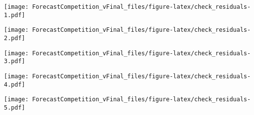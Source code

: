 \documentclass[
]{article}
\newenvironment{Shaded}{\begin{snugshade}}{\end{snugshade}}
\newcommand{\AttributeTok}[1]{\textcolor[rgb]{0.77,0.63,0.00}{#1}}
\newcommand{\FunctionTok}[1]{\textcolor[rgb]{0.00,0.00,0.00}{#1}}
\newcommand{\NormalTok}[1]{#1}
\newcommand{\SpecialCharTok}[1]{\textcolor[rgb]{0.00,0.00,0.00}{#1}}
\newcommand{\StringTok}[1]{\textcolor[rgb]{0.31,0.60,0.02}{#1}}
\begin{document}
\texttt{[image: ForecastCompetition\_vFinal\_files/figure-latex/check\_residuals-1.pdf]}

\begin{Shaded}
\end{Shaded}

\texttt{[image: ForecastCompetition\_vFinal\_files/figure-latex/check\_residuals-2.pdf]}

\begin{Shaded}
\end{Shaded}

\texttt{[image: ForecastCompetition\_vFinal\_files/figure-latex/check\_residuals-3.pdf]}

\begin{Shaded}
\end{Shaded}

\texttt{[image: ForecastCompetition\_vFinal\_files/figure-latex/check\_residuals-4.pdf]}

\begin{Shaded}
\end{Shaded}

\texttt{[image: ForecastCompetition\_vFinal\_files/figure-latex/check\_residuals-5.pdf]}

\begin{Shaded}
\end{Shaded}
\end{document}
